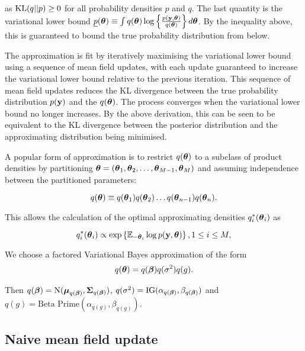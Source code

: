 \documentclass{amsart}[12pt]
\begin{document}
as $\text{KL}(q||p) \geq 0$ for all probability densities $p$ and $q$. The last quantity is the variational lower
bound $\underline{p}({\boldsymbol \theta}) \equiv \int q({\boldsymbol \theta}) \log\left\{ \frac{p({\bf y}, {\boldsymbol \theta})}{q({\boldsymbol \theta})} \right\}
d{\boldsymbol \theta}$. By the inequality above, this is guaranteed to bound the true probability distribution from below.

The approximation is fit by iteratively maximising the variational lower bound using a sequence of mean field
updates, with each update guaranteed to increase the variational lower bound relative to the previous
iteration. This sequence of mean field updates reduces the KL divergence between the true probability
distribution $p({\bf y})$ and the $q({\boldsymbol \theta})$. The process converges when the variational lower bound no longer
increases. By the above derivation, this can be seen to be equivalent to the KL divergence between the posterior distribution and the approximating distribution being minimised.

A popular form of approximation is to restrict $q({\boldsymbol \theta})$ to a subclass of product densities by partitioning
${\boldsymbol \theta} = ({\boldsymbol \theta}_1, {\boldsymbol \theta}_2, \ldots, {\boldsymbol \theta}_{M-1}, {\boldsymbol \theta}_M)$ and assuming independence between the
partitioned parameters:

\begin{equation*}
	q({\boldsymbol \theta}) \equiv q({\boldsymbol \theta}_1) q({\boldsymbol \theta}_2) \ldots q({\boldsymbol \theta}_{n-1}) q({\boldsymbol \theta}_n).
\end{equation*}

This allows the calculation of the optimal approximating densities $q_i^*({\boldsymbol \theta}_i)$ as

\begin{equation*}
	q_i^*({\boldsymbol \theta}_i) \propto \exp \left \{ \mathbb{E}_{-{\boldsymbol \theta}_i} \log p({\bf y}, {\boldsymbol \theta}) \right \}, 1 \leq i \leq M,
\end{equation*}

We choose a factored Variational Bayes approximation of the form
\begin{align*}
	q({\boldsymbol \theta}) = q({\boldsymbol \beta}) q(\sigma^2) q(g). 
\end{align*}

Then $q({\boldsymbol \beta}) = \text{N}({\boldsymbol \mu}_{q({\boldsymbol \beta})}, {\boldsymbol \Sigma}_{q({\boldsymbol \beta})})$, $q(\sigma^2) = \text{IG}(\alpha_{q({\boldsymbol \beta})}, \beta_{q({\boldsymbol \beta})})$ and $q(g) = \text{Beta Prime}(\alpha_{q(g)}, \beta_{q(g)})$.

\subsection{Naive mean field update}
\label{sec:naive_mean_field_updates}
\end{document}
